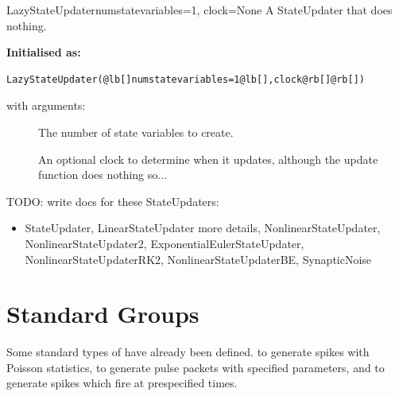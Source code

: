 \documentclass[letterpaper,10pt]{manual}
\begin{document}
\hypertarget{brian.LazyStateUpdater}{}\begin{classdesc}{LazyStateUpdater}{numstatevariables=1, clock=None}
A StateUpdater that does nothing.

\textbf{Initialised as:}

\begin{Verbatim}[commandchars=@\[\]]
LazyStateUpdater(@lb[]numstatevariables=1@lb[],clock@rb[]@rb[])
\end{Verbatim}

with arguments:
\begin{description}
\item[]
The number of state variables to create.

\item[]
An optional clock to determine when it updates,
although the update function does nothing so...

\end{description}
\end{classdesc}

TODO: write docs for these StateUpdaters:
\begin{itemize}
\item {} 
StateUpdater, LinearStateUpdater more details, NonlinearStateUpdater,
NonlinearStateUpdater2, ExponentialEulerStateUpdater,
NonlinearStateUpdaterRK2, NonlinearStateUpdaterBE,
SynapticNoise

\end{itemize}

\resetcurrentobjects


\section{Standard Groups}

Some standard types of \hyperlink{brian.NeuronGroup}{} have already been defined.
\hyperlink{brian.PoissonGroup}{} to generate spikes with Poisson statistics,
\hyperlink{brian.PulsePacket}{} to generate pulse packets with specified parameters,
\hyperlink{brian.SpikeGeneratorGroup}{} and \hyperlink{brian.MultipleSpikeGeneratorGroup}{} to
generate spikes which fire at prespecified times.
\end{document}

